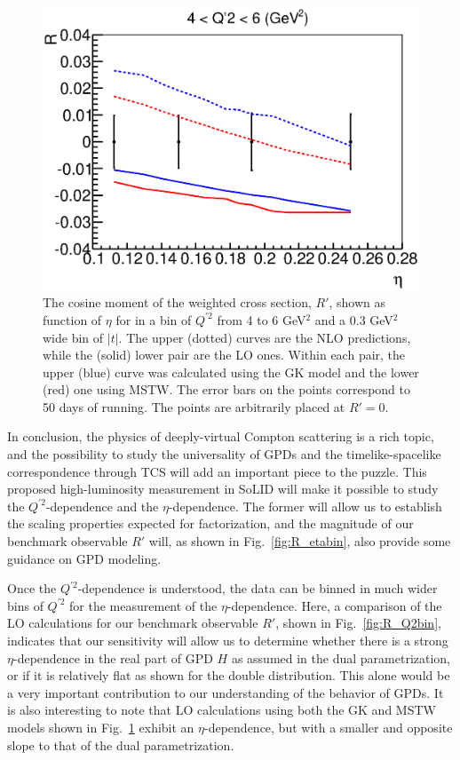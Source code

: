 \begin{figure}[t]
\includegraphics[scale=0.45]{R_NLO.eps}
\caption{\small{
The cosine moment of the weighted cross section, $R'$, shown as function
of $\eta$ for in a bin of $Q^{\prime 2}$ from 4 to 6 GeV$^2$ and a 0.3
GeV$^2$ wide bin of $|t|$. The upper (dotted) curves are the NLO predictions,
while the (solid) lower pair are the LO ones. Within each pair, the upper
(blue) curve was calculated using the GK model and the lower (red) one using
MSTW. The error bars on the points correspond to 50 days of running.
The points are arbitrarily placed at $R' = 0$.}}
\label{fig:R_NLO}
\end{figure}

In conclusion, the physics of deeply-virtual Compton scattering is a rich
topic, and the possibility to study the universality of GPDs and the
timelike-spacelike correspondence through TCS will add an important piece to
the puzzle. This proposed high-luminosity measurement in SoLID will make it
possible to study  the $Q^{\prime 2}$-dependence and the $\eta$-dependence.
The former will allow us to establish the scaling properties expected for
factorization, and the magnitude of our benchmark observable $R'$ will, as
shown in Fig.~\ref{fig:R_etabin}, also provide some guidance on GPD modeling.

Once the $Q^{\prime 2}$-dependence is understood, the data can be binned in
much wider bins of $Q^{\prime 2}$ for the measurement of the
$\eta$-dependence. Here, a comparison of the LO calculations for
our benchmark observable $R'$, shown in Fig.~\ref{fig:R_Q2bin}, indicates
that our sensitivity will allow us to determine whether there is a strong
$\eta$-dependence in the real part of GPD $H$ as assumed in the dual
parametrization, or if it is relatively flat as shown for the double
distribution. This alone would be a very important contribution to our
understanding of the behavior of GPDs. It is also interesting to note that LO
calculations using both the GK and MSTW models shown in Fig.~\ref{fig:R_NLO}
exhibit an $\eta$-dependence, but with a smaller and opposite slope to
that of the dual parametrization.

